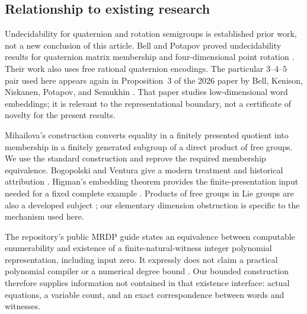 \documentclass[11pt,letterpaper]{article}
\numberwithin{equation}{section}
\theoremstyle{definition}
\theoremstyle{remark}
\begin{document}
\subsection{Relationship to existing research}
Undecidability for quaternion and rotation semigroups is established prior
work, not a new conclusion of this article. Bell and Potapov proved
undecidability results for quaternion matrix membership and four-dimensional
point rotation \cite{b62-bell-potapov}. Their work also uses free rational
quaternion encodings. The particular $3$--$4$--$5$ pair used here appears
again in Proposition~3 of the 2026 paper by Bell, Kenison, Niskanen,
Potapov, and Semukhin \cite{b62s16-BellEtAl2026}. That paper studies low-dimensional
word embeddings; it is relevant to the representational boundary, not a
certificate of novelty for the present results.

Mihailova's construction converts equality in a finitely presented quotient
into membership in a finitely generated subgroup of a direct product of
free groups. We use the standard construction and reprove the required
membership equivalence. Bogopolski and Ventura give a modern treatment and
historical attribution \cite{b62-bogopolski-ventura}. Higman's embedding theorem
provides the finite-presentation input needed for a fixed complete example
\cite{b62-higman}. Products of free groups in Lie groups are also a developed
subject \cite{b62s16-CampagnoloKammeyer}; our elementary dimension obstruction is
specific to the mechanism used here.

The repository's public MRDP guide states an equivalence between
computable enumerability and existence of a finite-natural-witness integer
polynomial representation, including input zero. It expressly does not
claim a practical polynomial compiler or a numerical degree bound
\cite{b62s16-ProveItMRDP}. Our bounded construction therefore supplies information
not contained in that existence interface: actual equations, a variable
count, and an exact correspondence between words and witnesses.
\end{document}
